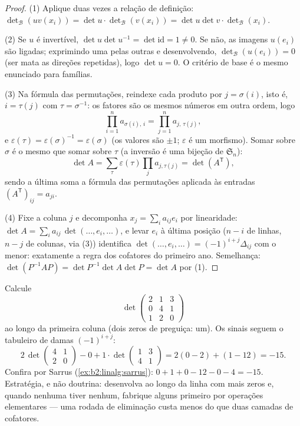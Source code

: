 \begin{proof}
(1) Aplique duas vezes a relação de definição:
$\det_{\mathcal B}(uv(x_i)) = \det u \cdot \det_{\mathcal
B}(v(x_i)) = \det u \det v \cdot \det_{\mathcal B}(x_i)$.

(2) Se $u$ é invertível, $\det u \det u^{-1} = \det \mathrm{id} =
1 \neq 0$. Se não, as imagens $u(e_i)$ são ligadas; exprimindo uma
pelas outras e desenvolvendo, $\det_{\mathcal B}(u(e_i)) = 0$
(ser  mata as direções repetidas), logo $\det u = 0$. O critério de
base é o mesmo enunciado para famílias.

(3) Na fórmula das permutações, reindexe cada produto por $j =
\sigma(i)$, isto é, $i = \tau(j)$ com $\tau = \sigma^{-1}$: os
fatores são os mesmos números em outra ordem, logo
\[
\prod_{i=1}^{n} a_{\sigma(i),\,i} = \prod_{j=1}^{n}
a_{j,\,\tau(j)} ,
\]
e $\varepsilon(\tau) = \varepsilon(\sigma)^{-1} =
\varepsilon(\sigma)$ (os valores são $\pm1$; $\varepsilon$ é um
morfismo). Somar sobre $\sigma$ é o mesmo que somar sobre
$\tau$ (a inversão é uma bijeção de $\mathfrak{S}_n$):
\[
\det A = \sum_{\tau}\varepsilon(\tau)\prod_j a_{j,\tau(j)}
= \det(A^{\mathsf T}),
\]
sendo a última soma a fórmula das permutações aplicada às
entradas  $(A^{\mathsf T})_{ij} = a_{ji}$.

(4) Fixe a coluna $j$ e decomponha $x_j = \sum_i a_{ij} e_i$ por
linearidade: $\det A = \sum_i a_{ij}\, \det(\dots, e_i, \dots)$, e
levar $e_i$ à última posição ($n - i$  de linhas,
$n - j$ de colunas, via (3)) identifica $\det(\dots, e_i, \dots) =
(-1)^{i+j}\Delta_{ij}$ com o menor: exatamente a regra dos cofatores
do primeiro ano. Semelhança: $\det(P^{-1}AP) = \det P^{-1}\det A \det P =
\det A$ por (1).
\end{proof}

\begin{example}\label{ex:b2:linalg:cofactorwork}
Calcule
\[
\det\begin{pmatrix}
2 & 1 & 3\\
0 & 4 & 1\\
1 & 2 & 0
\end{pmatrix}
\]
ao longo da primeira coluna (dois zeros de preguiça: um).
Os sinais seguem o tabuleiro de damas $(-1)^{i+j}$:
\[
2\,\det\begin{pmatrix}4 & 1\\ 2 & 0\end{pmatrix}
- 0
+ 1\cdot\det\begin{pmatrix}1 & 3\\ 4 & 1\end{pmatrix}
= 2(0 - 2) + (1 - 12) = -15 .
\]
Confira por Sarrus (\cref{ex:b2:linalg:sarrus}): $0 + 1 + 0
- 12 - 0 - 4 = -15$. Estratégia, e não doutrina: desenvolva ao longo da
linha com mais zeros e, quando nenhuma tiver nenhum, fabrique alguns
primeiro por operações elementares --- uma rodada de eliminação custa
menos do que duas camadas de cofatores.
\end{example}

